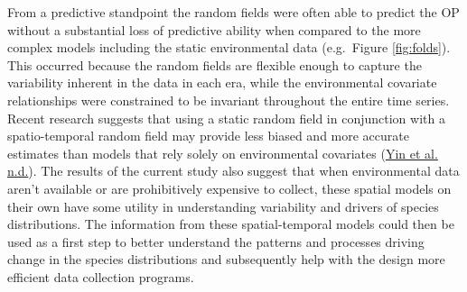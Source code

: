 \documentclass[
]{article}
\begin{document}
From a predictive standpoint the random fields were often able to predict the OP without a substantial loss of predictive ability when compared to the more complex models including the static environmental data (e.g.~Figure \ref{fig:folds}). This occurred because the random fields are flexible enough to capture the variability inherent in the data in each era, while the environmental covariate relationships were constrained to be invariant throughout the entire time series. Recent research suggests that using a static random field in conjunction with a spatio-temporal random field may provide less biased and more accurate estimates than models that rely solely on environmental covariates (\protect\hyperlink{ref-yinPrepSpatiotemporalModel2019}{Yin et al. n.d.}). The results of the current study also suggest that when environmental data aren't available or are prohibitively expensive to collect, these spatial models on their own have some utility in understanding variability and drivers of species distributions. The information from these spatial-temporal models could then be used as a first step to better understand the patterns and processes driving change in the species distributions and subsequently help with the design more efficient data collection programs.
\end{document}
